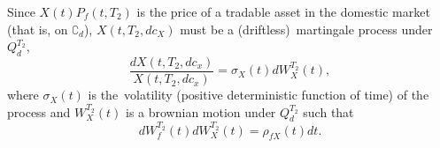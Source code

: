 \documentclass[11pt,reqno]{amsart}
\begin{document}
Since $X\left( t\right) P_{f}\left( t,T_{2}\right) $ is the price of a
tradable asset in the domestic market (that is, on $\complement _{d}$), $%
X\left( t,T_{2},dc_{X}\right) $ must be a (driftless)\ martingale process
under $Q_{d}^{T_{2}}$,%
\begin{equation}
\frac{dX\left( t,T_{2},dc_{x}\right) }{X\left( t,T_{2},dc_{x}\right) }%
=\sigma _{X}\left( t\right) dW_{X}^{T_{2}}\left( t\right) ,
\end{equation}%
where $\sigma _{X}\left( t\right) $ is the\ volatility (positive
deterministic function of time) of the process and $W_{X}^{T_{2}}\left(
t\right) $ is a brownian motion under $Q_{d}^{T_{2}}$ such that%
\begin{equation}
dW_{f}^{T_{2}}\left( t\right) dW_{X}^{T_{2}}\left( t\right) =\rho
_{fX}\left( t\right) dt.
\end{equation}
\end{document}
